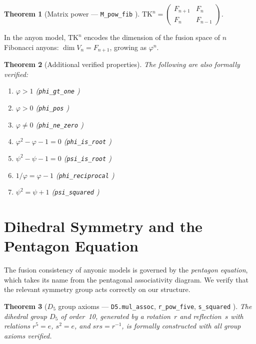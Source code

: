 \documentclass[11pt,a4paper]{article}
\newtheorem{theorem}{Theorem}[section]
\newcommand{\lean}[1]{\texttt{\small #1}}
\newcommand{\verified}{\textcolor{green!60!black}{\checkmark}}
\begin{document}
\begin{theorem}[Matrix power --- \lean{M\_pow\_fib} \verified]\label{thm:matpow}
  $\mathrm{TK}^n = \begin{pmatrix} F_{n+1} & F_n \\ F_n & F_{n-1} \end{pmatrix}$.
\end{theorem}

In the anyon model, $\mathrm{TK}^n$ encodes the dimension of the fusion space
of $n$ Fibonacci anyons: $\dim V_n = F_{n+1}$, growing as $\varphi^n$.

\begin{theorem}[Additional verified properties]\label{thm:additional}
  The following are also formally verified:
  \begin{enumerate}[label=(\alph*)]
    \item $\varphi > 1$ \quad (\lean{phi\_gt\_one} \verified)
    \item $\varphi > 0$ \quad (\lean{phi\_pos} \verified)
    \item $\varphi \neq 0$ \quad (\lean{phi\_ne\_zero} \verified)
    \item $\varphi^2 - \varphi - 1 = 0$ \quad (\lean{phi\_is\_root} \verified)
    \item $\psi^2 - \psi - 1 = 0$ \quad (\lean{psi\_is\_root} \verified)
    \item $1/\varphi = \varphi - 1$ \quad (\lean{phi\_reciprocal} \verified)
    \item $\psi^2 = \psi + 1$ \quad (\lean{psi\_squared} \verified)
  \end{enumerate}
\end{theorem}

\section{Dihedral Symmetry and the Pentagon Equation}\label{sec:D5}

The fusion consistency of anyonic models is governed by the \emph{pentagon equation},
which takes its name from the pentagonal associativity diagram. We verify that
the relevant symmetry group acts correctly on our structure.

\begin{theorem}[$D_5$ group axioms --- \lean{D5.mul\_assoc}, \lean{r\_pow\_five}, \lean{s\_squared} \verified]\label{thm:D5}
  The dihedral group $D_5$ of order~10, generated by a rotation~$r$ and
  reflection~$s$ with relations $r^5 = e$, $s^2 = e$, and $srs = r^{-1}$,
  is formally constructed with all group axioms verified.
\end{theorem}
\end{document}
